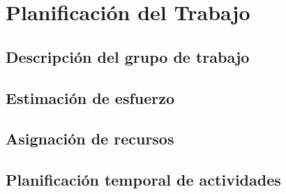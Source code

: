 \section{Planificación del Trabajo}

\subsection{Descripción del grupo de trabajo}

\subsection{Estimación de esfuerzo}

\subsection{Asignación de recursos}

\subsection{Planificación temporal de actividades}
